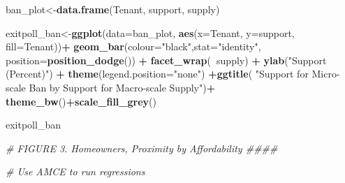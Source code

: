 \documentclass[]{article}
\newenvironment{Shaded}{\begin{snugshade}}{\end{snugshade}}
\newcommand{\CommentTok}[1]{\textcolor[rgb]{0.56,0.35,0.01}{\textit{#1}}}
\newcommand{\DataTypeTok}[1]{\textcolor[rgb]{0.13,0.29,0.53}{#1}}
\newcommand{\KeywordTok}[1]{\textcolor[rgb]{0.13,0.29,0.53}{\textbf{#1}}}
\newcommand{\NormalTok}[1]{#1}
\newcommand{\OperatorTok}[1]{\textcolor[rgb]{0.81,0.36,0.00}{\textbf{#1}}}
\newcommand{\StringTok}[1]{\textcolor[rgb]{0.31,0.60,0.02}{#1}}
\begin{document}
\begin{Shaded}
\begin{Highlighting}[]
{\NormalTok{ban_plot<-}\KeywordTok{data.frame}\NormalTok{(Tenant, support, supply)}

\NormalTok{exitpoll_ban<-}\KeywordTok{ggplot}\NormalTok{(}\DataTypeTok{data=}\NormalTok{ban_plot, }\KeywordTok{aes}\NormalTok{(}\DataTypeTok{x=}\NormalTok{Tenant, }\DataTypeTok{y=}\NormalTok{support, }\DataTypeTok{fill=}\NormalTok{Tenant))}\OperatorTok{+}
\StringTok{  }\KeywordTok{geom_bar}\NormalTok{(}\DataTypeTok{colour=}\StringTok{"black"}\NormalTok{,}\DataTypeTok{stat=}\StringTok{"identity"}\NormalTok{, }\DataTypeTok{position=}\KeywordTok{position_dodge}\NormalTok{()) }\OperatorTok{+}\StringTok{ }\KeywordTok{facet_wrap}\NormalTok{(}\OperatorTok{~}\NormalTok{supply) }\OperatorTok{+}
\StringTok{  }\KeywordTok{ylab}\NormalTok{(}\StringTok{"Support (Percent)"}\NormalTok{) }\OperatorTok{+}\StringTok{ }\KeywordTok{theme}\NormalTok{(}\DataTypeTok{legend.position=}\StringTok{"none"}\NormalTok{) }\OperatorTok{+}\KeywordTok{ggtitle}\NormalTok{( }\StringTok{"Support for Micro-scale Ban by Support for Macro-scale Supply"}\NormalTok{)}\OperatorTok{+}
\StringTok{  }\KeywordTok{theme_bw}\NormalTok{()}\OperatorTok{+}\KeywordTok{scale_fill_grey}\NormalTok{()}

\NormalTok{exitpoll_ban}


\CommentTok{# FIGURE 3. Homeowners, Proximity by Affordability ####}


\CommentTok{# Use AMCE to run regressions}

}
\end{Highlighting}
\end{Shaded}
\end{document}
